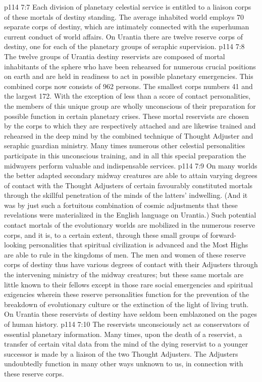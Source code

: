 \vs p114 7:7 \pc Each division of planetary celestial service is entitled to a liaison corps of these mortals of destiny standing. The average inhabited world employs 70 separate corps of destiny, which are intimately connected with the superhuman current conduct of world affairs. On Urantia there are twelve reserve corps of destiny, one for each of the planetary groups of seraphic supervision.
\vs p114 7:8 The twelve groups of Urantia destiny reservists are composed of mortal inhabitants of the sphere who have been rehearsed for numerous crucial positions on earth and are held in readiness to act in possible planetary emergencies. This combined corps now consists of 962 persons. The smallest corps numbers 41 and the largest 172. With the exception of less than a score of contact personalities, the members of this unique group are wholly unconscious of their preparation for possible function in certain planetary crises. These mortal reservists are chosen by the corps to which they are respectively attached and are likewise trained and rehearsed in the deep mind by the combined technique of Thought Adjuster and seraphic guardian ministry. Many times numerous other celestial personalities participate in this unconscious training, and in all this special preparation the midwayers perform valuable and indispensable services.
\vs p114 7:9 On many worlds the better adapted secondary midway creatures are able to attain varying degrees of contact with the Thought Adjusters of certain favourably constituted mortals through the skillful penetration of the minds of the latters’ indwelling. (And it was by just such a fortuitous combination of cosmic adjustments that these revelations were materialized in the English language on Urantia.) Such potential contact mortals of the evolutionary worlds are mobilized in the numerous reserve corps, and it is, to a certain extent, through these small groups of forward\hyp{}looking personalities that spiritual civilization is advanced and the Most Highs are able to rule in the kingdoms of men. The men and women of these reserve corps of destiny thus have various degrees of contact with their Adjusters through the intervening ministry of the midway creatures; but these same mortals are little known to their fellows except in those rare social emergencies and spiritual exigencies wherein these reserve personalities function for the prevention of the breakdown of evolutionary culture or the extinction of the light of living truth. On Urantia these reservists of destiny have seldom been emblazoned on the pages of human history.
\vs p114 7:10 The reservists unconsciously act as conservators of essential planetary information. Many times, upon the death of a reservist, a transfer of certain vital data from the mind of the dying reservist to a younger successor is made by a liaison of the two Thought Adjusters. The Adjusters undoubtedly function in many other ways unknown to us, in connection with these reserve corps.

